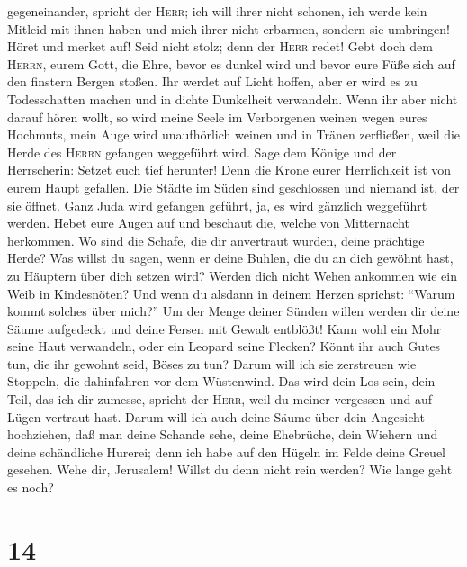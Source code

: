 gegeneinander, spricht der \textsc{Herr}; ich will ihrer nicht schonen,
ich werde kein Mitleid mit ihnen haben und mich ihrer nicht erbarmen,
sondern sie umbringen!  Höret und merket auf! Seid nicht
stolz; denn der \textsc{Herr} redet!  Gebt doch dem
\textsc{Herrn}, eurem Gott, die Ehre, bevor es dunkel wird und bevor
eure Füße sich auf den finstern Bergen stoßen. Ihr werdet auf Licht
hoffen, aber er wird es zu Todesschatten machen und in dichte Dunkelheit
verwandeln.  Wenn ihr aber nicht darauf hören wollt, so
wird meine Seele im Verborgenen weinen wegen eures Hochmuts, mein Auge
wird unaufhörlich weinen und in Tränen zerfließen, weil die Herde des
\textsc{Herrn} gefangen weggeführt wird.  Sage dem Könige
und der Herrscherin: Setzet euch tief herunter! Denn die Krone eurer
Herrlichkeit ist von eurem Haupt gefallen.  Die Städte im
Süden sind geschlossen und niemand ist, der sie öffnet. Ganz Juda wird
gefangen geführt, ja, es wird gänzlich weggeführt werden.
 Hebet eure Augen auf und beschaut die, welche von
Mitternacht herkommen. Wo sind die Schafe, die dir anvertraut wurden,
deine prächtige Herde?  Was willst du sagen, wenn er
deine Buhlen, die du an dich gewöhnt hast, zu Häuptern über dich setzen
wird? Werden dich nicht Wehen ankommen wie ein Weib in Kindesnöten?
 Und wenn du alsdann in deinem Herzen sprichst: ``Warum
kommt solches über mich?'' Um der Menge deiner Sünden willen werden dir
deine Säume aufgedeckt und deine Fersen mit Gewalt entblößt!
 Kann wohl ein Mohr seine Haut verwandeln, oder ein
Leopard seine Flecken? Könnt ihr auch Gutes tun, die ihr gewohnt seid,
Böses zu tun?  Darum will ich sie zerstreuen wie
Stoppeln, die dahinfahren vor dem Wüstenwind.  Das wird
dein Los sein, dein Teil, das ich dir zumesse, spricht der
\textsc{Herr}, weil du meiner vergessen und auf Lügen vertraut hast.
 Darum will ich auch deine Säume über dein Angesicht
hochziehen, daß man deine Schande sehe,  deine Ehebrüche,
dein Wiehern und deine schändliche Hurerei; denn ich habe auf den Hügeln
im Felde deine Greuel gesehen. Wehe dir, Jerusalem! Willst du denn nicht
rein werden? Wie lange geht es noch?

\hypertarget{section-13}{%
\section{14}\label{section-13}}


